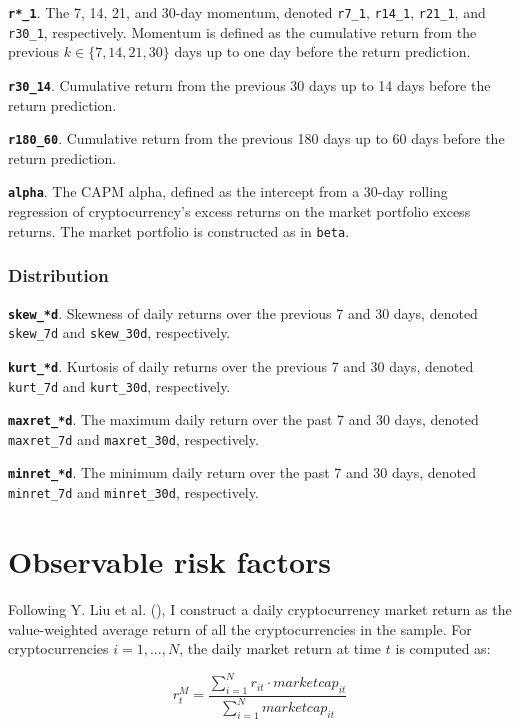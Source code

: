 \documentclass[
  12pt,
  a4paper,
  openany]{scrbook}
\begin{document}
\textbf{\texttt{r*\_1}}. The 7, 14, 21, and 30-day momentum, denoted
\texttt{r7\_1}, \texttt{r14\_1}, \texttt{r21\_1}, and \texttt{r30\_1},
respectively. Momentum is defined as the cumulative return from the
previous \(k \in \{7, 14, 21, 30\}\) days up to one day before the
return prediction.

\textbf{\texttt{r30\_14}}. Cumulative return from the previous 30 days
up to 14 days before the return prediction.

\textbf{\texttt{r180\_60}}. Cumulative return from the previous 180 days
up to 60 days before the return prediction.

\textbf{\texttt{alpha}}. The CAPM alpha, defined as the intercept from a
30-day rolling regression of cryptocurrency's excess returns on the
market portfolio excess returns. The market portfolio is constructed as
in \texttt{beta}.

\subsubsection{Distribution}\label{distribution}

\textbf{\texttt{skew\_*d}}. Skewness of daily returns over the previous
7 and 30 days, denoted \texttt{skew\_7d} and \texttt{skew\_30d},
respectively.

\textbf{\texttt{kurt\_*d}}. Kurtosis of daily returns over the previous
7 and 30 days, denoted \texttt{kurt\_7d} and \texttt{kurt\_30d},
respectively.

\textbf{\texttt{maxret\_*d}}. The maximum daily return over the past 7
and 30 days, denoted \texttt{maxret\_7d} and \texttt{maxret\_30d},
respectively.

\textbf{\texttt{minret\_*d}}. The minimum daily return over the past 7
and 30 days, denoted \texttt{minret\_7d} and \texttt{minret\_30d},
respectively.

\section{Observable risk factors}\label{sec-obs_factors}

Following Y. Liu et al. (), I
construct a daily cryptocurrency market return as the value-weighted
average return of all the cryptocurrencies in the sample. For
cryptocurrencies \(i = 1, ..., N\), the daily market return at time
\(t\) is computed as:

\[
r_t^M = \frac{\sum_{i=1}^N r_{it} \cdot marketcap_{it}}
             {\sum_{i=1}^N marketcap_{it} }
\]
\end{document}
